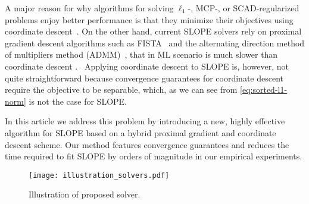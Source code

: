 A major reason for why algorithms for solving $\ell_1$-, MCP-, or SCAD-regularized problems enjoy better
performance is that they minimize their objectives using coordinate
descent~\cite{breheny2011, friedman2010}.
On the other hand, current SLOPE solvers rely on proximal gradient descent
algorithms such as FISTA~\cite{beck2009} and the
alternating direction method of multipliers method (ADMM)~\cite{boyd2010}, that in ML scenario is much slower than coordinate descent \cite{moreau2022benchopt}.
\
Applying coordinate descent to SLOPE is, however, not quite straightforward
because convergence guarantees for coordinate descent require the
objective to be separable, which, as we can see from \eqref{eq:sorted-l1-norm}
is not the case for SLOPE.


In this article we address this problem by introducing a new, highly effective
algorithm for SLOPE based on a hybrid proximal gradient and coordinate descent
scheme. Our method features convergence guarantees and reduces the time
required to fit SLOPE by orders of magnitude in our empirical experiments.

\begin{figure}[htbp]
  \centering
  \texttt{[image: illustration\_solvers.pdf]}
  \caption{Illustration of proposed solver. }
  \label{fig:illustration-solver}
\end{figure}
